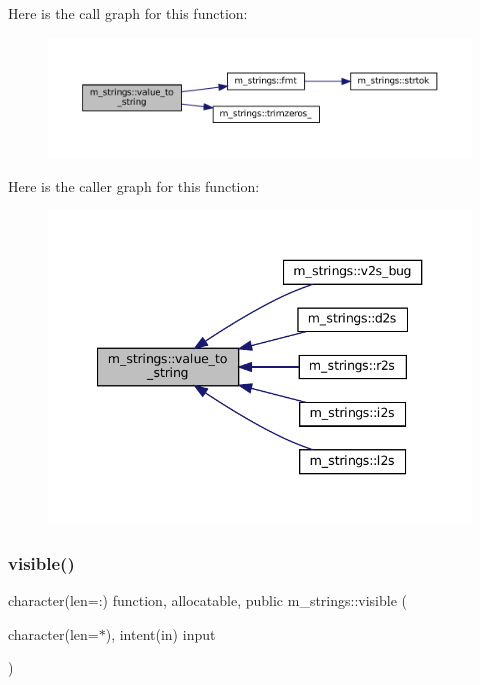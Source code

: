 Here is the call graph for this function\+:\nopagebreak
\begin{figure}[H]
\begin{center}
\leavevmode
\includegraphics[width=350pt]{namespacem__strings_a5dcd73626c8909c12f8ea29028927a88_cgraph}
\end{center}
\end{figure}
Here is the caller graph for this function\+:\nopagebreak
\begin{figure}[H]
\begin{center}
\leavevmode
\includegraphics[width=340pt]{namespacem__strings_a5dcd73626c8909c12f8ea29028927a88_icgraph}
\end{center}
\end{figure}
\mbox{\label{namespacem__strings_a791e24ceb690010fd42a6c1f48311b55}} 
\subsubsection{\texorpdfstring{visible()}{visible()}}
{\footnotesize\ttfamily character(len=\+:) function, allocatable, public m\+\_\+strings\+::visible (\begin{DoxyParamCaption}\item[{character(len=$\ast$), intent(in)}]{input }\end{DoxyParamCaption})}



